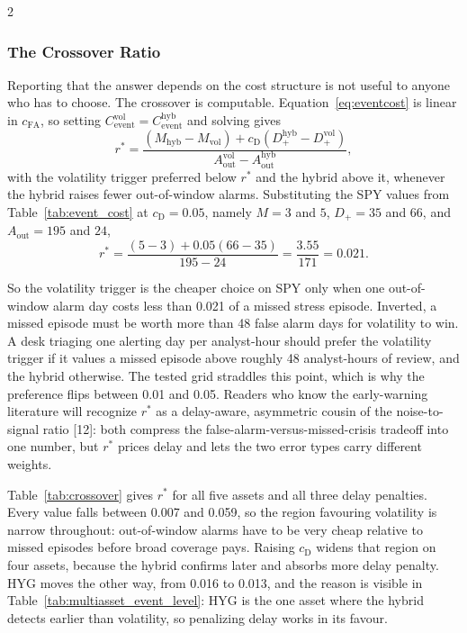 \documentclass{book}
\makeatletter
\def\my@tag@font{\normalsize}
\let\amsmath@eqref\eqref
\renewcommand\eqref[1]{{\let\my@tag@font\relax\amsmath@eqref{#1}}}
\makeatother
\begin{document}
\begin{multicols}{2}
\subsubsection{The Crossover Ratio}
Reporting that the answer depends on the cost structure is not useful to anyone who has to choose. The crossover is computable. Equation~\eqref{eq:eventcost} is linear in $c_{\mathrm{FA}}$, so setting $C_{\mathrm{event}}^{\mathrm{vol}}=C_{\mathrm{event}}^{\mathrm{hyb}}$ and solving gives
\begin{equation}
\label{eq:crossover}
r^{*}=\frac{(M_{\mathrm{hyb}}-M_{\mathrm{vol}})+c_{\mathrm{D}}(D_{+}^{\mathrm{hyb}}-D_{+}^{\mathrm{vol}})}{A_{\mathrm{out}}^{\mathrm{vol}}-A_{\mathrm{out}}^{\mathrm{hyb}}},
\end{equation}
with the volatility trigger preferred below $r^{*}$ and the hybrid above it, whenever the hybrid raises fewer out-of-window alarms. Substituting the SPY values from Table~\ref{tab:event_cost} at $c_{\mathrm{D}}=0.05$, namely $M=3$ and $5$, $D_+=35$ and $66$, and $A_{\mathrm{out}}=195$ and $24$,
\begin{equation}
r^{*}=\frac{(5-3)+0.05(66-35)}{195-24}=\frac{3.55}{171}=0.021 .
\end{equation}

So the volatility trigger is the cheaper choice on SPY only when one out-of-window alarm day costs less than 0.021 of a missed stress episode. Inverted, a missed episode must be worth more than 48 false alarm days for volatility to win. A desk triaging one alerting day per analyst-hour should prefer the volatility trigger if it values a missed episode above roughly 48 analyst-hours of review, and the hybrid otherwise. The tested grid straddles this point, which is why the preference flips between 0.01 and 0.05. Readers who know the early-warning literature will recognize $r^{*}$ as a delay-aware, asymmetric cousin of the noise-to-signal ratio [12]: both compress the false-alarm-versus-missed-crisis tradeoff into one number, but $r^{*}$ prices delay and lets the two error types carry different weights.

Table~\ref{tab:crossover} gives $r^{*}$ for all five assets and all three delay penalties. Every value falls between 0.007 and 0.059, so the region favouring volatility is narrow throughout: out-of-window alarms have to be very cheap relative to missed episodes before broad coverage pays. Raising $c_{\mathrm{D}}$ widens that region on four assets, because the hybrid confirms later and absorbs more delay penalty. HYG moves the other way, from 0.016 to 0.013, and the reason is visible in Table~\ref{tab:multiasset_event_level}: HYG is the one asset where the hybrid detects earlier than volatility, so penalizing delay works in its favour.


\end{multicols}
\end{document}
